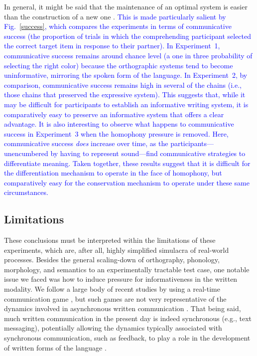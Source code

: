 \documentclass[doc,biblatex]{apa7}
\newcommand\newmaterial[1]{\textcolor{blue}{#1}}
\begin{document}
In general, it might be said that the maintenance of an optimal system is easier than the construction of a new one \parencite[see also][]{Smith:2002}. \newmaterial{This is made particularly salient by Fig.~\ref{success}, which compares the experiments in terms of communicative success (the proportion of trials in which the comprehending participant selected the correct target item in response to their partner). In Experiment~1, communicative success remains around chance level (a one in three probability of selecting the right color) because the orthographic systems tend to become uninformative, mirroring the spoken form of the language. In Experiment~2, by comparison, communicative success remains high in several of the chains (i.e., those chains that preserved the expressive system). This suggests that, while it may be difficult for participants to establish an informative writing system, it is comparatively easy to preserve an informative system that offers a clear advantage. It is also interesting to observe what happens to communicative success in Experiment~3 when the homophony pressure is removed. Here, communicative success \textit{does} increase over time, as the participants---unencumbered by having to represent sound---find communicative strategies to differentiate meaning. Taken together, these results suggest that it is difficult for the differentiation mechanism to operate in the face of homophony, but comparatively easy for the conservation mechanism to operate under these same circumstances.}

\subsection{Limitations}

These conclusions must be interpreted within the limitations of these experiments, which are, after all, highly simplified simulacra of real-world processes. Besides the general scaling-down of orthography, phonology, morphology, and semantics to an experimentally tractable test case, one notable issue we faced was how to induce pressure for informativeness in the written modality. We follow a large body of recent studies by using a real-time communication game \parencite[e.g.,][]{Carr:2017, Kanwal:2017, Kirby:2015, Raviv:2018, Saldana:2019, Silvey:2019, Winters:2015}, but such games are not very representative of the dynamics involved in asynchronous written communication \parencite[although see][for some approaches]{Winters:2019}. That being said, much written communication in the present day is indeed synchronous (e.g., text messaging), potentially allowing the dynamics typically associated with synchronous communication, such as feedback, to play a role in the development of written forms of the language \parencite{Lupyan:2016}.
\end{document}
